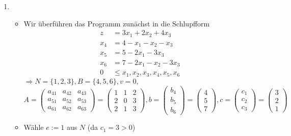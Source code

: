 \documentclass[a4paper,10pt]{article}
\begin{document}
\begin{enumerate}
\item   \begin{itemize}
        \item   Wir überführen das Programm zunächst in die Schlupfform
                \begin{align*}
                    z   &=     3x_1 + 2x_2 + 4x_3 \\
                    x_4 &= 4 -  x_1 -  x_2 -  x_3 \\
                    x_5 &= 5 - 2x_1        - 3x_3 \\
                    x_6 &= 7 - 2x_1 -  x_2 - 3x_3 \\
                      0 &\leq x_1, x_2, x_3, x_4, x_5, x_6 
                \end{align*}
                $\Rightarrow N = \{1,2,3\}, B = \{4,5,6\}, v = 0,$
                \[
                 A = \begin{pmatrix}
                        a_{41} & a_{42} & a_{43} \\
                        a_{51} & a_{52} & a_{53} \\
                        a_{61} & a_{62} & a_{63}
                     \end{pmatrix}
                   = \begin{pmatrix}
                        1 & 1 & 2 \\
                        2 & 0 & 3 \\
                        2 & 1 & 3
                     \end{pmatrix}, 
                 b = \begin{pmatrix}b_4 \\ b_5 \\ b_6 \end{pmatrix} 
                   = \begin{pmatrix}4 \\ 5 \\ 7 \end{pmatrix},
                 c = \begin{pmatrix}c_1 \\ c_2 \\ c_3 \end{pmatrix} 
                   = \begin{pmatrix}3 \\ 2 \\ 1 \end{pmatrix}
                \]
        \item   Wähle $e := 1$ aus $N$ (da $c_1 = 3 > 0$)

\end{itemize}
\end{enumerate}
\end{document}
